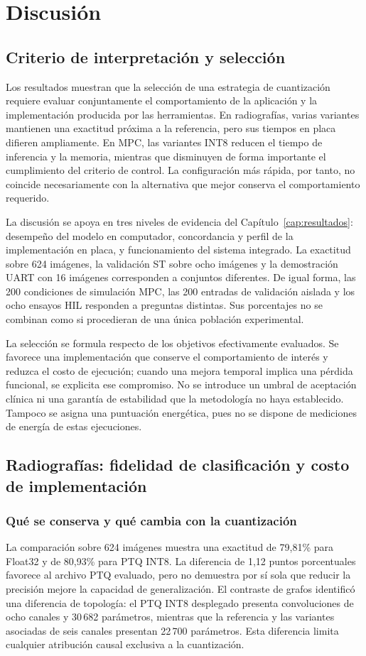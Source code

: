 \chapter{Discusión}\label{cap:discusion}\label{cap:seleccion}
\section{Criterio de interpretación y selección}
Los resultados muestran que la selección de una estrategia de cuantización requiere evaluar conjuntamente el comportamiento de la aplicación y la implementación producida por las herramientas. En radiografías, varias variantes mantienen una exactitud próxima a la referencia, pero sus tiempos en placa difieren ampliamente. En MPC, las variantes INT8 reducen el tiempo de inferencia y la memoria, mientras que disminuyen de forma importante el cumplimiento del criterio de control. La configuración más rápida, por tanto, no coincide necesariamente con la alternativa que mejor conserva el comportamiento requerido.

La discusión se apoya en tres niveles de evidencia del Capítulo~\ref{cap:resultados}: desempeño del modelo en computador, concordancia y perfil de la implementación en placa, y funcionamiento del sistema integrado. La exactitud sobre 624 imágenes, la validación ST sobre ocho imágenes y la demostración UART con 16 imágenes corresponden a conjuntos diferentes. De igual forma, las 200 condiciones de simulación MPC, las 200 entradas de validación aislada y los ocho ensayos HIL responden a preguntas distintas. Sus porcentajes no se combinan como si procedieran de una única población experimental.

La selección se formula respecto de los objetivos efectivamente evaluados. Se favorece una implementación que conserve el comportamiento de interés y reduzca el costo de ejecución; cuando una mejora temporal implica una pérdida funcional, se explicita ese compromiso. No se introduce un umbral de aceptación clínica ni una garantía de estabilidad que la metodología no haya establecido. Tampoco se asigna una puntuación energética, pues no se dispone de mediciones de energía de estas ejecuciones.

\section{Radiografías: fidelidad de clasificación y costo de implementación}
\subsection{Qué se conserva y qué cambia con la cuantización}
La comparación sobre 624 imágenes muestra una exactitud de 79,81\% para Float32 y de 80,93\% para PTQ INT8. La diferencia de 1,12 puntos porcentuales favorece al archivo PTQ evaluado, pero no demuestra por sí sola que reducir la precisión mejore la capacidad de generalización. El contraste de grafos identificó una diferencia de topología: el PTQ INT8 desplegado presenta convoluciones de ocho canales y 30\,682 parámetros, mientras que la referencia y las variantes asociadas de seis canales presentan 22\,700 parámetros. Esta diferencia limita cualquier atribución causal exclusiva a la cuantización.

